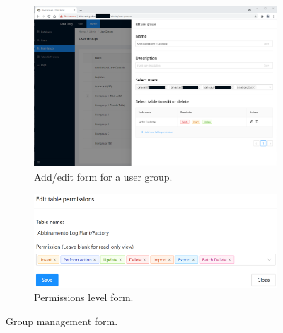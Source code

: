 \begin{figure}[!htb]
  \centering
  \begin{subfigure}{\linewidth}
    \includegraphics[width=15.8cm]{chapters/images/ch_3/FE/Admin/edit_user_group.png}
    \caption{Add/edit form for a user group.}
    \label{a}
  \end{subfigure}
  \begin{subfigure}{\linewidth}
    \includegraphics[width=15.8cm]{chapters/images/ch_3/FE/Admin/tabPermissions.png}
    \caption{Permissions level form.}
    \label{b}
  \end{subfigure}
  \caption{Group management form.}
  \label{fig:editGroup}
\end{figure}


